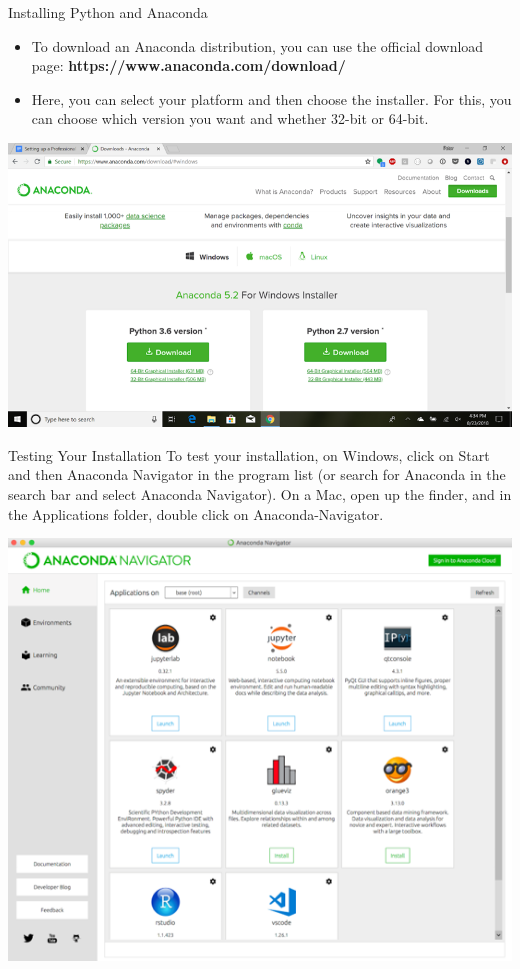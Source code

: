 \documentclass[11pt]{beamer}
\begin{document}
\begin{frame}{Installing Python and Anaconda}
\footnotesize{
\begin{itemize}
\item  To download an Anaconda distribution, you can use the official download page: \textbf{https://www.anaconda.com/download/}
\item Here, you can select your platform and then choose the installer. For this, you can choose which version you want and whether 32-bit or 64-bit.
\end{itemize}}
\normalsize
\begin{center}
\includegraphics[scale=.4]{../05-pictures/lesson-1-1_pic_24.png} 
\end{center}
\end{frame}
\begin{frame}{Testing Your Installation}
To test your installation, on Windows, click on Start and then Anaconda Navigator in the program list (or search for Anaconda in the search bar and select Anaconda Navigator). On a Mac, open up the finder, and in the Applications folder, double click on Anaconda-Navigator.
\begin{center}
\includegraphics[scale=.4]{../05-pictures/lesson-1-1_pic_25.png} 
\end{center}
\end{frame}
\end{document}
